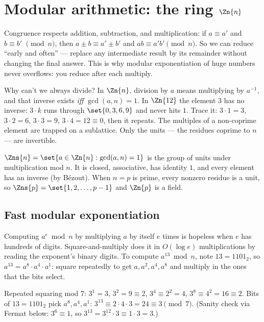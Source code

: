 \section{Modular arithmetic: the ring $\Zn{n}$}
\label{ch40:modring}

Congruence respects addition, subtraction, and multiplication: if $a\equiv a'$ and $b\equiv b'$
$\pmod n$, then $a\pm b \equiv a'\pm b'$ and $ab\equiv a'b'\pmod n$. So we can reduce ``early and
often'' --- replace any intermediate result by its remainder without changing the final answer.
This is why modular exponentiation of huge numbers never overflows: you reduce after each multiply.

\begin{walkbox}
Why can't we always divide? In $\Zn{n}$, division by $a$ means multiplying by $a^{-1}$, and that
inverse exists \emph{iff} $\gcd(a,n)=1$. In $\Zn{12}$ the element $3$ has no inverse: $3\cdot k$ runs
through $\set{0,3,6,9}$ and never hits $1$. Trace it: $3\cdot 1=3$, $3\cdot 2=6$, $3\cdot 3=9$,
$3\cdot 4=12\equiv 0$, then it repeats. The multiples of a non-coprime element are trapped on a
sublattice. Only the units --- the residues coprime to $n$ --- are invertible.
\end{walkbox}

\begin{definition}[Units]
\label{ch40:def-units}
$\Zns{n} = \set{a \in \Zn{n} : \gcd(a,n)=1}$ is the group of units under multiplication mod $n$. It
is closed, associative, has identity $1$, and every element has an inverse (by B\'ezout). When $n=p$
is prime, every nonzero residue is a unit, so $\Zns{p}=\set{1,2,\dots,p-1}$ and $\Zn{p}$ is a field.
\end{definition}

\subsection{Fast modular exponentiation}
\label{ch40:fastexp}

Computing $a^e \bmod n$ by multiplying $a$ by itself $e$ times is hopeless when $e$ has hundreds of
digits. Square-and-multiply does it in $O(\log e)$ multiplications by reading the exponent's binary
digits. To compute $a^{13}\bmod n$, note $13 = 1101_2$, so
$a^{13} = a^{8}\cdot a^{4}\cdot a^{1}$: square repeatedly to get $a,a^2,a^4,a^8$ and multiply in the
ones that the bits select.

\begin{example}[$3^{13}\bmod 7$]
\label{ch40:ex-modexp}
Repeated squaring mod $7$: $3^1=3$, $3^2=9\equiv 2$, $3^4\equiv 2^2=4$, $3^8\equiv 4^2=16\equiv 2$.
Bits of $13=1101_2$ pick $a^8,a^4,a^1$: $3^{13}\equiv 2\cdot 4\cdot 3 = 24 \equiv 3 \pmod 7$. (Sanity
check via Fermat below: $3^6\equiv 1$, so $3^{13}=3^{12}\cdot 3\equiv 1\cdot 3 = 3$.)
\end{example}

